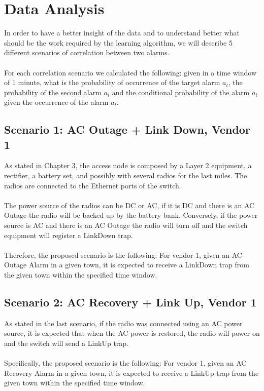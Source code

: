 \documentclass[10pt,a4paper]{report}
\begin{document}
\section{Data Analysis} 
In order to have a better insight of the data and to understand better what should be the work required by the learning algorithm, we will describe 5 different scenarios of correlation between two alarms.
\\\\
For each correlation scenario we calculated the following: given in a time window of 1 minute, what is the probability of occurrence of the target alarm $a_t$, the probability of the second alarm $a_i$ and the conditional probability of the alarm $a_i$ given the occurrence of the alarm $a_t$.

\subsection{Scenario 1: AC Outage + Link Down, Vendor 1}
As stated in Chapter 3, the access node is composed by a Layer 2 equipment, a rectifier, a battery set, and possibly with several radios for the last miles. The radios are connected to the Ethernet ports of the switch.
\\\\
The power source of the radios can be DC or AC, if it is DC and there is an AC Outage the radio will be backed up by the battery bank. Conversely, if the power source is AC and there is an AC Outage the radio will turn off and the switch equipment will register a LinkDown trap.
\\\\
Therefore, the proposed scenario is the following: For vendor 1, given an AC Outage Alarm in a given town, it is expected to receive a LinkDown trap from the given town within the specified time window.

\subsection{Scenario 2: AC Recovery + Link Up, Vendor 1} 
As stated in the last scenario, if the radio was connected using an AC power source, it is expected that when the AC power is restored, the radio will power on and the switch will send a LinkUp trap.
\\\\
Specifically, the proposed scenario is the following: For vendor 1, given an AC Recovery Alarm in a given town, it is expected to receive a LinkUp trap from the given town within the specified time window.
\end{document}
